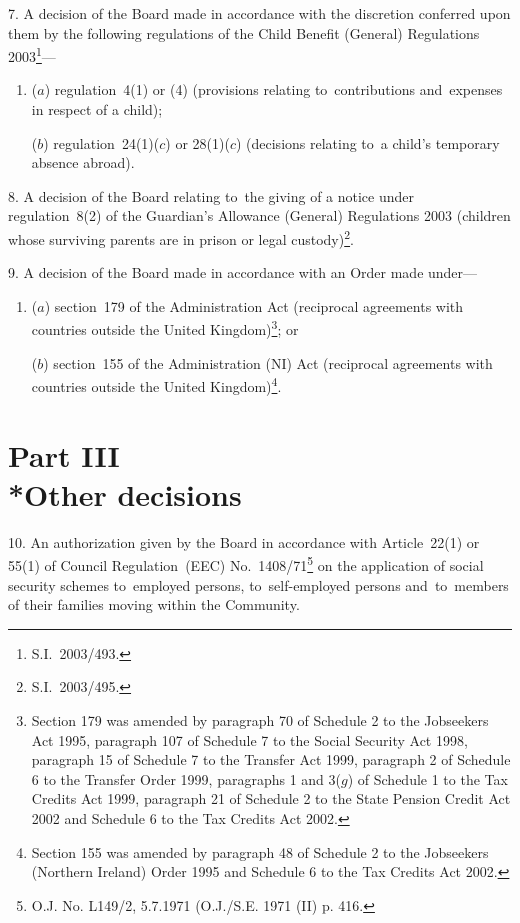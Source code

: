 \documentclass[12pt,a4paper]{article}
\begin{document}
\medskip

7.  A decision of the Board made in accordance with the discretion conferred upon them by the following regulations of the Child Benefit (General) Regulations 2003\footnote{S.I.~2003/493.}—
\begin{enumerate}\item[]
($a$) regulation~4(1) or (4) (provisions relating to~contributions and~expenses in respect of a child);

($b$) regulation~24(1)($c$)  or 28(1)($c$)  (decisions relating to~a child’s temporary absence abroad).
\end{enumerate}

\medskip

8.  A decision of the Board relating to~the giving of a notice under regulation~8(2) of the Guardian’s Allowance (General) Regulations 2003 (children whose surviving parents are in prison or legal custody)\footnote{S.I.~2003/495.}.

\medskip

9.  A decision of the Board made in accordance with an Order made under—
\begin{enumerate}\item[]
($a$) section~179 of the Administration Act (reciprocal agreements with countries outside the United Kingdom)\footnote{Section 179 was amended by paragraph 70 of Schedule 2 to the Jobseekers Act 1995, paragraph 107 of Schedule 7 to the Social Security Act 1998, paragraph 15 of Schedule 7 to the Transfer Act 1999, paragraph 2 of Schedule 6 to the Transfer Order 1999, paragraphs 1 and 3($g$) of Schedule 1 to the Tax Credits Act 1999, paragraph 21 of Schedule 2 to the State Pension Credit Act 2002 and Schedule 6 to the Tax Credits Act 2002.}; or

($b$) section~155 of the Administration (NI) Act (reciprocal agreements with countries outside the United Kingdom)\footnote{Section 155 was amended by paragraph 48 of Schedule 2 to the Jobseekers (Northern Ireland) Order 1995 and Schedule 6 to the Tax Credits Act 2002.}.
\end{enumerate}

\section[Part III --- Other decisions]{Part III\\*Other decisions}

\renewcommand\parthead{--- Schedule 2 Part III}

10.  An authorization given by the Board in accordance with Article~22(1) or 55(1) of Council Regulation~(EEC) No.~1408/71\footnote{\frenchspacing O.J. No. L149/2, 5.7.1971 (O.J./S.E. 1971 (II) p. 416.} on the application of social security schemes to~employed persons, to~self-employed persons and~to~members of their families moving within the Community. 
\end{document}
